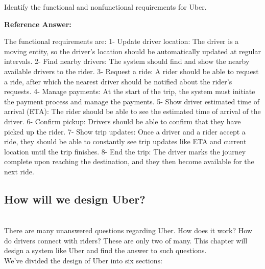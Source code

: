 Identify the functional and nonfunctional requirements for Uber.

\textbf{Reference Answer:}

The functional requirements are: 1- Update driver location: The driver is a moving entity, so the driver's location should be automatically updated at regular intervals. 2- Find nearby drivers: The system should find and show the nearby available drivers to the rider. 3- Request a ride: A rider should be able to request a ride, after which the nearest driver should be notified about the rider's requests. 4- Manage payments: At the start of the trip, the system must initiate the payment process and manage the payments. 5- Show driver estimated time of arrival (ETA): The rider should be able to see the estimated time of arrival of the driver. 6- Confirm pickup: Drivers should be able to confirm that they have picked up the rider. 7- Show trip updates: Once a driver and a rider accept a ride, they should be able to constantly see trip updates like ETA and current location until the trip finishes. 8- End the trip: The driver marks the journey complete upon reaching the destination, and they then become available for the next ride.

\subsection{How will we design Uber?}\label{EjlONe_YF4hyWafN5MQ5k}
\\
There are many unanswered questions regarding Uber. How does it work? How do drivers connect with riders? These are only two of many. This chapter will design a system like Uber and find the answer to such questions.
\\
We've divided the design of Uber into six sections:

